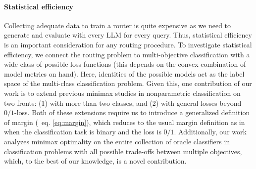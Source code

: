 

\paragraph{Statistical efficiency} Collecting adequate data to train a router is quite expensive as we need to generate and evaluate with every LLM for every query.
Thus, statistical efficiency is an important consideration for any routing procedure. To investigate statistical efficiency, we connect the routing problem to multi-objective classification with a wide class of possible loss functions (this depends on the convex combination of model metrics on hand). Here, identities of the possible models act as the label space of the multi-class classification problem. Given this, one contribution of our work is to extend previous minimax studies in nonparametric classification \citep{audibert2007Fast} on two fronts: (1) with more than two classes, and (2)  with general losses beyond $0/1$-loss. Both of these extensions require us to introduce a generalized definition of margin (\cf\ eq. \eqref{eq:margin}), which reduces to the usual margin definition as in \citet{audibert2007Fast} when the classification task is binary and the loss is $0/1$.  Additionally, our work analyzes minimax optimality on the entire collection of oracle classifiers in classification problems with all possible trade-offs between multiple objectives, which, to the best of our knowledge, is a novel contribution.

 
